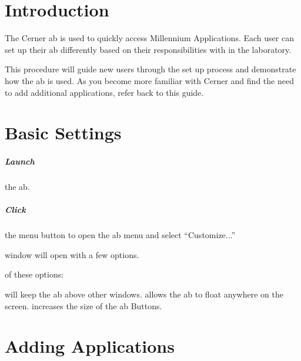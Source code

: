 \chapter{Introduction}\label{ch:ab_intro}

The Cerner \gls{ab} is used to quickly access Millennium Applications. Each user can set up their \gls{ab}  differently based on their responsibilities with in the laboratory.

This procedure will guide new users through the set up process and demonstrate how the \gls{ab} is used. As you become more familiar with Cerner and find the need to add additional applications, refer back to this guide.


\chapter{Basic Settings}\label{ch:ab_settings}

\paragraph{Launch} the \gls{ab}.\\


\paragraph{Click} the menu button  to open the \gls{ab} menu and select ``Customize...'' \begin{marginfigure}[8\baselineskip]
\end{marginfigure}

 window will open with a few options.\\


 of these options:
\begin{itemize}
    \small
     will keep the \gls{ab} above other windows.
     allows the \gls{ab} to float anywhere on the screen.
     increases the size of the \gls{ab} Buttons.
\end{itemize}

\chapter{Adding Applications}\label{ch:ab_addapp}

